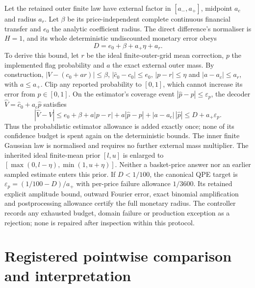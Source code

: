 \documentclass[11pt]{article}
\begin{document}
Let the retained outer finite law have external factor in
$[a_-,a_+]$, midpoint $a_c$ and radius $a_r$. Let $\beta$ be its
price-independent complete continuous financial transfer and $e_0$
the analytic coefficient radius. The direct difference's normaliser
is $H=1$, and its whole deterministic undiscounted monetary error obeys
\begin{equation}
 D=e_0+\beta+a_+\eta+a_r.
\end{equation}
To derive this bound, let $r$ be the ideal finite-outer-grid mean correction,
$p$ the implemented flag probability and $a$ the exact external outer mass.
By construction, $|V-(c_0+ar)|\leq\beta$,
$|\widehat c_0-c_0|\leq e_0$, $|p-r|\leq\eta$ and
$|a-a_c|\leq a_r$, with $a\leq a_+$. Clip any reported probability
to $[0,1]$, which cannot increase its error from $p\in[0,1]$.
On the estimator's coverage event $|\widehat p-p|\leq\varepsilon_p$,
the decoder $\widehat V=\widehat c_0+a_c\widehat p$ satisfies
\begin{equation}
 |\widehat V-V|
 \leq e_0+\beta+a|p-r|+a|\widehat p-p|
             +|a-a_c|\,|\widehat p|
 \leq D+a_+\varepsilon_p.
\end{equation}
Thus the probabilistic estimator allowance is added exactly once; none
of its confidence budget is spent again on the deterministic bounds.
The inner finite Gaussian law is normalised and requires no further
external mass multiplier. The inherited ideal finite-mean prior $[l,u]$
is enlarged to $[\max(0,l-\eta),\min(1,u+\eta)]$. Neither a
basket-price answer nor an earlier sampled estimate enters this prior.
If $D<1/100$, the canonical QPE target is
$\varepsilon_p=(1/100-D)/a_+$ with per-price failure allowance
$1/3600$. Its retained explicit amplitude bound, outward Fourier error,
exact binomial amplification and postprocessing allowance certify the
full monetary radius. The controller records any exhausted budget,
domain failure or production exception as a rejection; none is repaired
after inspection within this protocol.

\section{Registered pointwise comparison and interpretation}
\end{document}
